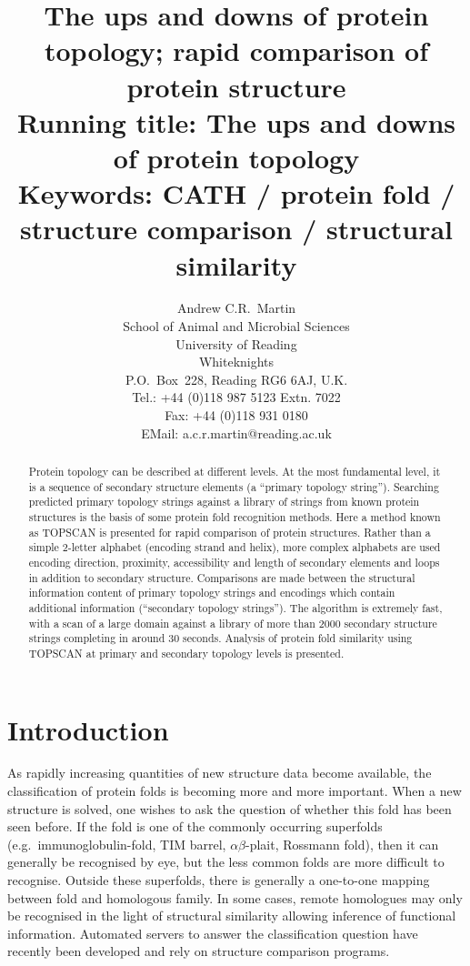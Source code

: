 \documentclass{article}
\title{The ups and downs of protein topology; rapid comparison of protein
structure\\
{\large {\bfseries Running title:} The ups and downs of protein topology}\\
{\large {\bfseries Keywords:} CATH / protein fold / structure
comparison / structural similarity}}
\author{Andrew C.R.\ Martin\\
School of Animal and Microbial Sciences\\
University of Reading\\
Whiteknights\\
P.O.~Box~228, Reading RG6 6AJ, U.K.\\
Tel.: +44 (0)118 987 5123 Extn. 7022\\
Fax: +44 (0)118 931 0180 \\
EMail: a.c.r.martin@reading.ac.uk}
\begin{document}
\maketitle


\begin{abstract}
Protein topology can be described at different levels. At the most
fundamental level, it is a sequence of secondary structure elements (a
``primary topology string''). Searching predicted primary topology
strings against a library of strings from known protein structures is
the basis of some protein fold recognition methods.  Here a method
known as TOPSCAN is presented for rapid comparison of protein
structures. Rather than a simple 2-letter alphabet (encoding strand
and helix), more complex alphabets are used encoding direction,
proximity, accessibility and length of secondary elements and loops in
addition to secondary structure.  Comparisons are made between the
structural information content of primary topology strings and
encodings which contain additional information (``secondary topology
strings'').  The algorithm is extremely fast, with a scan of a large
domain against a library of more than 2000 secondary structure strings
completing in around 30 seconds. Analysis of protein fold similarity
using TOPSCAN at primary and secondary topology levels is presented.
\end{abstract}

\section{Introduction}
As rapidly increasing quantities of new structure data become
available, the classification of protein folds is becoming more and
more important. When a new structure is solved, one wishes to ask the
question of whether this fold has been seen before. If the fold is one
of the commonly occurring superfolds (e.g.\ immunoglobulin-fold, TIM
barrel, $\alpha\beta$-plait, Rossmann fold), then it can generally be
recognised by eye, but the less common folds are more difficult to
recognise. Outside these superfolds, there is generally a one-to-one
mapping between fold and homologous family.  In some cases, remote
homologues may only be recognised in the light of structural
similarity allowing inference of functional information.  Automated
servers to answer the classification question have recently been
developed and rely on structure comparison programs.
\end{document}

